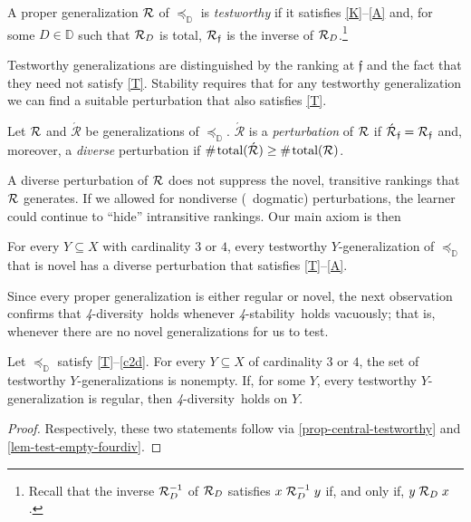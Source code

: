 \documentclass[12pt,a4paper,twoside]{article}
\newcommand{\novel}{\mathfrak f}
\newcommand{\preceqb}{\mathbin{\preceq}}
\newcommand{\countof}{\mathbin{\#}\hskip1pt}
\newcommand{\ext}{\mathrel{\mc R}}
\newcommand{\extb}{\mathbin{\mc R}}
\newcommand{\hextb}{\mathbin{\hat{\mathbin{\mathcal R}}}}
\newcommand{\aext}{\mathrel{\acute{\mathrel{\mathcal R}}}}
\newcommand{\aextb}{\mathbin{\acute{\mathbin{\mathcal R}}}}
\newcommand{\total}{\textup{total}}
\newcommand{\mbbd}{{\mathds D}}
\newcommand{\stability}{\textit{4}-\textup{{stability}}}
\newcommand{\fourdiv}{\textit{4}-\textup{diversity}}
\begin{document}
\begin{definition*}\label{def-testworthy}

  A proper {generalization} $\ext$ of $\preceqb_{\mbbd}$ is \emph{testworthy}
  if it satisfies \textup{\ref{K}--\ref{A}} and, for some $D\in \mbbd$ such
  that $\ext_{D}$ is total, $\extb _{ \novel }$ is the inverse of
  $\extb_{D}$.\footnote{Recall that the inverse $\ext _{ D } ^{ - 1 }$ of $\ext
  _{ D }$ satisfies $x \ext _{ D } ^{ - 1 } y$ if, and only if, $y \ext _{ D }
  x$.}
\end{definition*}
Testworthy {generalization}s are distinguished by the ranking at $\novel$ and
the fact that they need not satisfy \ref{T}.  Stability requires that for any
testworthy {generalization} we can find a suitable perturbation that also
satisfies \ref{T}.
\begin{definition*} Let $\ext$ and $\aext$ be {generalization}s of
  $\preceqb_{\mbbd}$. $\aext$ is a \emph{perturbation} of $\ext$ if
  $\aextb_{\novel } = \extb_{\novel}$ and, moreover, a \emph{{{diverse}}}
  perturbation if $\countof \total (\aextb) \geq \countof \total ( \extb)$.
\end{definition*}
A diverse perturbation of $\ext$ does not suppress the novel, transitive
rankings that $\ext$ generates. If we allowed for nondiverse (\ie\ dogmatic)
perturbations, the learner could continue to ``hide'' intransitive rankings.
Our main axiom is then
\begin{stability*}\label{P}
  For every $Y\subseteq X$ with cardinality $3$ or $4$, every testworthy
  $Y$-{generalization} of $\preceqb _{ \mbbd }$ that is novel has a {{diverse}}
  perturbation that satisfies \ref{T}–\ref{A}.
\end{stability*}
Since every proper {generalization} is either regular or novel, the next
observation confirms that \fourdiv\ holds whenever \stability\ holds vacuously;
that is, whenever there are no novel {generalization}s for us to test.
\begin{observation} \label{obs-testworthy}
  Let $\preceq_{\mbbd}$ satisfy \ref{T}–\ref{c2d}. For
  every $Y\subseteq X$ of cardinality $3$ or $4$, the set of testworthy
  $Y$-{generalization}s is nonempty. If, for some $Y$, every testworthy
  $Y$-{generalization} is regular, then \fourdiv\ holds on $Y$.
\end{observation}
\begin{proof}\label{proof-obs-testworthy}
  Respectively, these two statements follow via \cref{prop-central-testworthy}
  and \cref{lem-test-empty-fourdiv}.
\end{proof}
\end{document}
